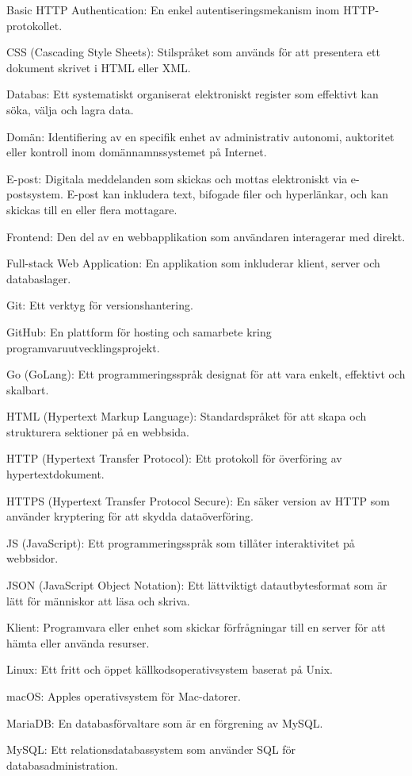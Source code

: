 Basic HTTP Authentication: En enkel autentiseringsmekanism inom HTTP-protokollet.

CSS (Cascading Style Sheets): Stilspråket som används för att presentera ett dokument skrivet i HTML eller XML.

Databas: Ett systematiskt organiserat elektroniskt register som effektivt kan söka, välja och lagra data.

Domän: Identifiering av en specifik enhet av administrativ autonomi, auktoritet eller kontroll inom domännamnssystemet på Internet.

E-post: Digitala meddelanden som skickas och mottas elektroniskt via e-postsystem. E-post kan inkludera text, bifogade filer och hyperlänkar, och kan skickas till en eller flera mottagare.

Frontend: Den del av en webbapplikation som användaren interagerar med direkt.

Full-stack Web Application: En applikation som inkluderar klient, server och databaslager.

Git: Ett verktyg för versionshantering.

GitHub: En plattform för hosting och samarbete kring programvaruutvecklingsprojekt.

Go (GoLang): Ett programmeringsspråk designat för att vara enkelt, effektivt och skalbart.

HTML (Hypertext Markup Language): Standardspråket för att skapa och strukturera sektioner på en webbsida.

HTTP (Hypertext Transfer Protocol): Ett protokoll för överföring av hypertextdokument.

HTTPS (Hypertext Transfer Protocol Secure): En säker version av HTTP som använder kryptering för att skydda dataöverföring.

JS (JavaScript): Ett programmeringsspråk som tillåter interaktivitet på webbsidor.

JSON (JavaScript Object Notation): Ett lättviktigt datautbytesformat som är lätt för människor att läsa och skriva.

Klient: Programvara eller enhet som skickar förfrågningar till en server för att hämta eller använda resurser.

Linux: Ett fritt och öppet källkodsoperativsystem baserat på Unix.

macOS: Apples operativsystem för Mac-datorer.

MariaDB: En databasförvaltare som är en förgrening av MySQL.

MySQL: Ett relationsdatabassystem som använder SQL för databasadministration.

